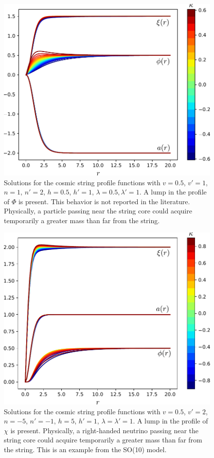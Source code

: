 \begin{figure}
	\centering
	\includegraphics[scale=1]{./figures/Figure_3.pdf}
	\caption{Solutions for the cosmic string profile functions with $v = 0.5$, $v'=1$, $n=1$, $n'= 2$, $h=0.5$, $h'=1$, $\lambda=0.5,\lambda'=1$.  A lump in the profile of $\Phi$ is present. This behavior is not reported in the literature. Physically, a particle passing near the string core could acquire temporarily a greater mass than far from the string.}
	\label{fig:fig4}
\end{figure}

\begin{figure}
	\centering
	\includegraphics[scale=1]{./figures/n-5h5np-1hp1l1lp1v05vp2.pdf}
	\caption{Solutions for the cosmic string profile functions with $v = 0.5$, $v'=2$, $n=-5$, $n'=-1$, $h=5$, $h'=1$, $\lambda=\lambda'=1$. A lump in the profile of $\chi$ is present. Physically, a right-handed neutrino passing near the string core could acquire temporarily a greater mass than far from the string. This is an example from the SO(10) model.}
	\label{fig:n-5h5np-1hp1l1lp1v05vp2}
\end{figure}

